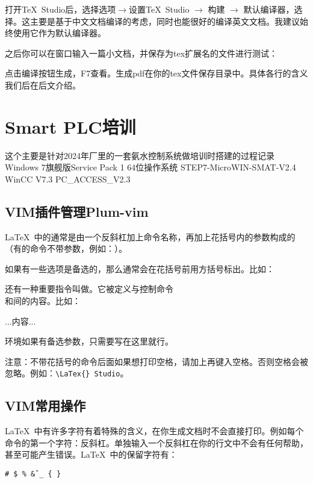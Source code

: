 打开\TeX\ Studio后，选择选项$\rightarrow$设置\TeX\ Studio $\rightarrow$ 构建 $\rightarrow$ 默认编译器，选择\xelatex{}。这主要是基于中文文档编译的考虑，同时\xelatex 也能很好的编译英文文档。我建议始终使用它作为默认编译器。


之后你可以在窗口输入一篇小文档，并保存为tex扩展名的文件进行测试：
点击编译按钮生成，F7查看。生成pdf在你的tex文件保存目录中。具体各行的含义我们后在后文介绍。

\section{Smart PLC培训}
这个主要是针对2024年厂里的一套氨水控制系统做培训时搭建的过程记录
Windows 7旗舰版Service Pack 1 64位操作系统
STEP7-MicroWIN-SMAT-V2.4
WinCC V7.3
PC\_ACCESS\_V2.3
\subsection{VIM插件管理Plum-vim}
\LaTeX\ 中的通常是由一个反斜杠加上命令名称，再加上花括号内的参数构成的（有的命令不带参数，例如：）。
如果有一些选项是备选的，那么通常会在花括号前用方括号标出。比如：
还有一种重要指令叫做。它被定义与控制命令\\和间的内容。比如：%
\begin{latex}

...内容...

\end{latex}
环境如果有备选参数，只需要写在这里就行。

注意：不带花括号的命令后面如果想打印空格，请加上{\color{cyan}{一对内部为空的花括号}}再键入空格。否则空格会被忽略。例如：\verb+\LaTex{} Studio+。
\subsection{VIM常用操作}
\LaTeX\ 中有许多字符有着特殊的含义，在你生成文档时不会直接打印。例如每个命令的第一个字符：反斜杠。单独输入一个反斜杠在你的行文中不会有任何帮助，甚至可能产生错误。\LaTeX\ 中的保留字符有：
\begin{center}
	\texttt{\# \$ \% \^ \& \_ \{ \} }
\end{center}

